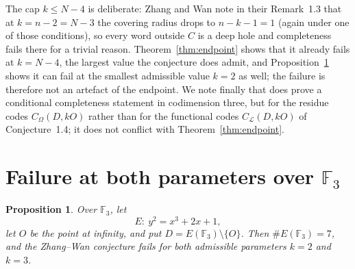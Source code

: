 \documentclass[11pt]{amsart}
\newtheorem{proposition}[theorem]{Proposition}
\newcommand{\F}{\mathbb{F}}
\newcommand{\CL}{C_{\mathcal L}}
\begin{document}
The cap $k\le N-4$ is deliberate: Zhang and Wan note in their
Remark~1.3 that at $k=n-2=N-3$ the covering radius drops to $n-k-1=1$
(again under one of those conditions), so every word outside $C$ is a
deep hole and completeness fails there for a trivial reason.
Theorem~\ref{thm:endpoint} shows that it already fails at $k=N-4$, the
largest value the conjecture does admit, and Proposition~\ref{prop:F3}
shows it can fail at the smallest admissible value $k=2$ as well; the
failure is therefore not an artefact of the endpoint. We note finally
that \cite[Corollary~4.11]{ZhangWan} does prove a conditional
completeness statement in codimension three, but for the residue codes
$C_\Omega(D,kO)$ rather than for the functional codes $\CL(D,kO)$ of
Conjecture~1.4; it does not conflict with Theorem~\ref{thm:endpoint}.

\section{Failure at both parameters over \texorpdfstring{$\F_3$}{F3}}

\begin{proposition}\label{prop:F3}
Over $\F_3$, let
\[
  E:\ y^2=x^3+2x+1,
\]
let $O$ be the point at infinity, and put
$D=E(\F_3)\setminus\{O\}$. Then $\#E(\F_3)=7$, and the Zhang--Wan
conjecture fails for both admissible parameters $k=2$ and $k=3$.
\end{proposition}
\end{document}
